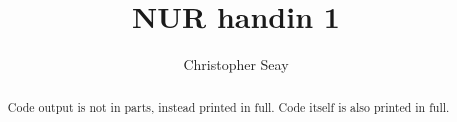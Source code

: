 \documentclass[a4paper,10pt]{article}
\title{NUR handin 1}
\author{Christopher Seay}
\begin{document}
\maketitle

\begin{abstract}
 Code output is not in parts, instead printed in full. Code itself is also
 printed in full.
\end{abstract}


\end{document}
